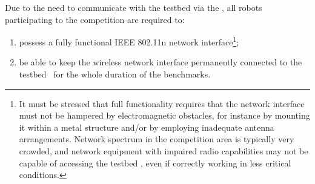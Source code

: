 Due to the need to communicate with the testbed via the \wifi, all robots participating to the \erlir competition are required to:
\begin{enumerate}
\item possess a fully functional IEEE 802.11n network interface\footnote{It must be stressed that full functionality requires that the network interface must not be hampered by electromagnetic obstacles, for instance by mounting it within a metal structure and/or by employing inadequate antenna arrangements. Network spectrum in the competition area is typically very crowded, and network equipment with impaired radio capabilities may not be capable of accessing the testbed \wifi, even if correctly working in less critical conditions.};
\item be able to keep the wireless network interface permanently connected to the testbed \wifi \ for the whole duration of the benchmarks.
\end{enumerate}



